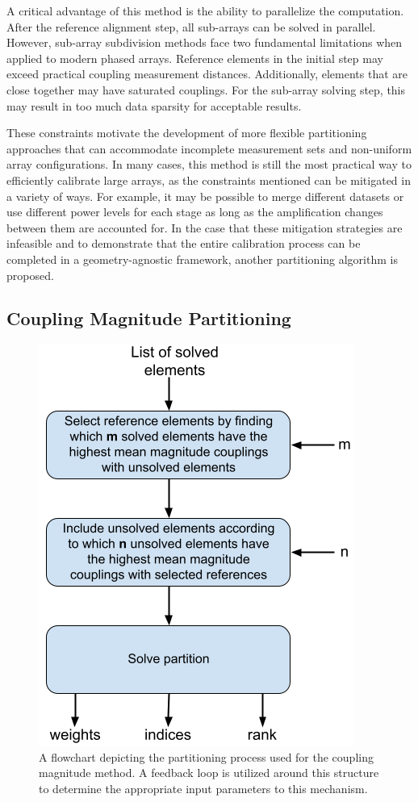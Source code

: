 \documentclass[journal]{IEEEtran}
\begin{document}
A critical advantage of this method is the ability to parallelize the computation. After the reference alignment step, all sub-arrays can be solved in parallel. However, sub-array subdivision methods face two fundamental limitations when applied to modern phased arrays. Reference elements in the initial step may exceed practical coupling measurement distances. Additionally, elements that are close together may have saturated couplings. For the sub-array solving step, this may result in too much data sparsity for acceptable results.

These constraints motivate the development of more flexible partitioning approaches that can accommodate incomplete measurement sets and non-uniform array configurations. In many cases, this method is still the most practical way to efficiently calibrate large arrays, as the constraints mentioned can be mitigated in a variety of ways. For example, it may be possible to merge different datasets or use different power levels for each stage as long as the amplification changes between them are accounted for. In the case that these mitigation strategies are infeasible and to demonstrate that the entire calibration process can be completed in a geometry-agnostic framework, another partitioning algorithm is proposed.


\subsection{Coupling Magnitude Partitioning}

\begin{figure}
    \centering
    \includegraphics[width=0.75\linewidth]{Inner Scope Distcal.png}
    \caption{A flowchart depicting the partitioning process used for the coupling magnitude method. A feedback loop is utilized around this structure to determine the appropriate input parameters to this mechanism.}
    \label{fig:innerScope}
\end{figure}
\end{document}
